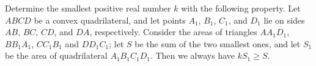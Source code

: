 Determine the smallest positive real number $ k$ with the following property. Let $ ABCD$ be a convex quadrilateral, and let points $ A_1$, $ B_1$, $ C_1$, and $ D_1$ lie on sides $ AB$, $ BC$, $ CD$, and $ DA$, respectively. Consider the areas of triangles $ AA_1D_1$, $ BB_1A_1$, $ CC_1B_1$ and $ DD_1C_1$; let $ S$ be the sum of the two smallest ones, and let $ S_1$ be the area of quadrilateral $ A_1B_1C_1D_1$. Then we always have $ kS_1\ge S$.